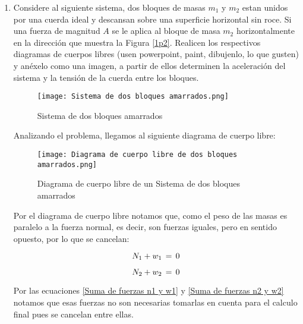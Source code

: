 \documentclass[letterpaper, 12pt]{article}
\begin{document}
\begin{enumerate}
    \item Considere al siguiente sistema, dos bloques de masas $m_{1}$ y $m_{2}$ estan unidos por una cuerda ideal y descansan sobre una superficie horizontal sin roce. Si una fuerza de magnitud $A$ se le aplica al bloque de masa $m_{2}$ horizontalmente en la dirección que muestra la Figura \ref{1p2}. Realicen los respectivos diagramas de cuerpos libres (usen powerpoint, paint, dibujenlo, lo que gusten) y anéxelo como una imagen, a partir de ellos determinen la aceleración del sistema y la tensión de la cuerda entre los bloques. 
        
        \begin{figure}[H]
            \centering
            \texttt{[image: Sistema de dos bloques amarrados.png]}
            \caption{Sistema de dos bloques amarrados}
            \label{fig:Sistema de dos bloques amarrados}
        \end{figure}
        
    Analizando el problema, llegamos al siguiente diagrama de cuerpo libre: 
        
        \begin{figure}[H]
            \centering
            \texttt{[image: Diagrama de cuerpo libre de dos bloques amarrados.png]}
            \caption{Diagrama de cuerpo libre de un Sistema de dos bloques amarrados}
            \label{fig:Diagrama de cuerpo libre de un Sistema de dos bloques amarrados}
        \end{figure}
        
    Por el diagrama de cuerpo libre notamos que, como el peso de las masas es paralelo a la fuerza normal, es decir, son fuerzas iguales, pero en sentido opuesto, por lo que se cancelan:
    
    \begin{equation}
        \label{Suma de fuerzas n1 y w1}
        N_{1} + w_{1} \thinspace = \thinspace 0
    \end{equation}
    
    \begin{equation}
        \label{Suma de fuerzas n2 y w2}
        N_{2} + w_{2} \thinspace = \thinspace 0
    \end{equation}
    
    Por las ecuaciones \ref{Suma de fuerzas n1 y w1} y \ref{Suma de fuerzas n2 y w2} notamos que esas fuerzas no son necesarias tomarlas en cuenta para el calculo final pues se cancelan entre ellas. \\
    

\end{enumerate}
\end{document}
